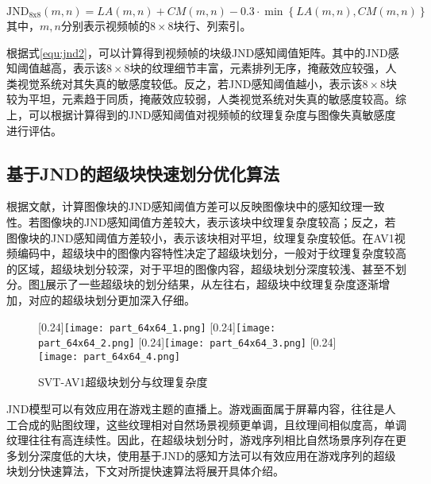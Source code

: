 	\begin{equation} \label{equ:jnd2}
		\mathrm{JND_{8x8}}(m, n) = LA(m, n) + CM(m, n) - 0.3 \cdot \min \left\{LA(m, n) , CM(m, n)\right\}
	\end{equation}
	其中，$m, n$分别表示视频帧的$8\times 8$块行、列索引。

  根据式\ref{equ:jnd2}，可以计算得到视频帧的块级JND感知阈值矩阵。其中的JND感知阈值越高，表示该$8\times 8$块的纹理细节丰富，元素排列无序，掩蔽效应较强，人类视觉系统对其失真的敏感度较低。反之，若JND感知阈值越小，表示该$8\times 8$块较为平坦，元素趋于同质，掩蔽效应较弱，人类视觉系统对失真的敏感度较高。综上，可以根据计算得到的JND感知阈值对视频帧的纹理复杂度与图像失真敏感度进行评估。

  \subsection{基于JND的超级块快速划分优化算法}
  根据文献\cite{guoqingxiangImprovedAdaptiveQuantization2017}，计算图像块的JND感知阈值方差可以反映图像块中的感知纹理一致性。若图像块的JND感知阈值方差较大，表示该块中纹理复杂度较高；反之，若图像块的JND感知阈值方差较小，表示该块相对平坦，纹理复杂度较低。在AV1视频编码中，超级块中的图像内容特性决定了超级块划分，一般对于纹理复杂度较高的区域，超级块划分较深，对于平坦的图像内容，超级块划分深度较浅、甚至不划分。图\ref{fig:jnd-sb}展示了一些超级块的划分结果，从左往右，超级块中纹理复杂度逐渐增加，对应的超级块划分更加深入仔细。

  \begin{figure}[!hbtp]
    \centering
                    [0.24\textwidth]{\texttt{[image: part\_64x64\_1.png]}\label{fig:jnd-sb-1}}
                    [0.24\textwidth]{\texttt{[image: part\_64x64\_2.png]}}
                    [0.24\textwidth]{\texttt{[image: part\_64x64\_3.png]}}
                    [0.24\textwidth]{\texttt{[image: part\_64x64\_4.png]}\label{fig:jnd-sb-4}}
    \caption{SVT-AV1超级块划分与纹理复杂度}
    \label{fig:jnd-sb}
  \end{figure}

  JND模型可以有效应用在游戏主题的直播上。游戏画面属于屏幕内容，往往是人工合成的贴图纹理，这些纹理相对自然场景视频更单调，且纹理间相似度高，单调纹理往往有高连续性。因此，在超级块划分时，游戏序列相比自然场景序列存在更多划分深度低的大块，使用基于JND的感知方法可以有效应用在游戏序列的超级块划分快速算法，下文对所提快速算法将展开具体介绍。
